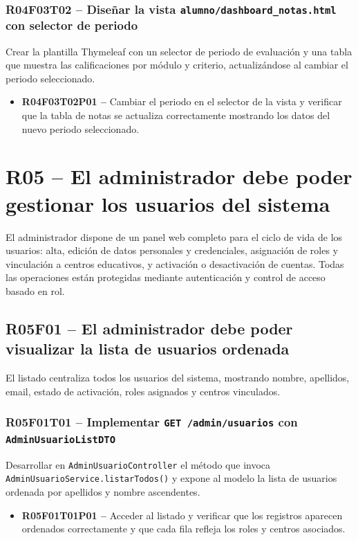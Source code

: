 \documentclass[12pt, a4paper]{report}
\begin{document}
\subsubsection{R04F03T02 -- Diseñar la vista \texttt{alumno/dashboard\_notas.html} con selector de periodo}
Crear la plantilla Thymeleaf con un selector de periodo de evaluación y una tabla que muestra las calificaciones por módulo y criterio, actualizándose al cambiar el periodo seleccionado.
\begin{itemize}
  \item \textbf{R04F03T02P01 --} Cambiar el periodo en el selector de la vista y verificar que la tabla de notas se actualiza correctamente mostrando los datos del nuevo periodo seleccionado.
\end{itemize}

\section{R05 -- El administrador debe poder gestionar los usuarios del sistema}

El administrador dispone de un panel web completo para el ciclo de vida de los usuarios: alta, edición de datos personales y credenciales, asignación de roles y vinculación a centros educativos, y activación o desactivación de cuentas. Todas las operaciones están protegidas mediante autenticación y control de acceso basado en rol.

\subsection{R05F01 -- El administrador debe poder visualizar la lista de usuarios ordenada}

El listado centraliza todos los usuarios del sistema, mostrando nombre, apellidos, email, estado de activación, roles asignados y centros vinculados.

\subsubsection{R05F01T01 -- Implementar \texttt{GET /admin/usuarios} con \texttt{AdminUsuarioListDTO}}
Desarrollar en \texttt{AdminUsuarioController} el método que invoca \texttt{AdminUsuarioService.listarTodos()} y expone al modelo la lista de usuarios ordenada por apellidos y nombre ascendentes.
\begin{itemize}
  \item \textbf{R05F01T01P01 --} Acceder al listado y verificar que los registros aparecen ordenados correctamente y que cada fila refleja los roles y centros asociados.
\end{itemize}
\end{document}
